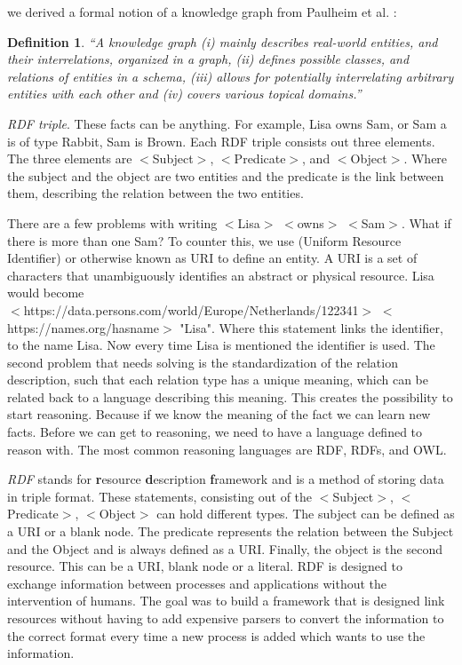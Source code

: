 \documentclass[11pt,letterpaper ,oneside ]{book}
\newtheorem{definition}{Definition}
\begin{document}
	we derived a formal notion of a knowledge graph from Paulheim et al. \cite{HeikoP:2016}:
	\begin{definition} 
		“A knowledge graph (i) mainly describes real-world entities, and their interrelations, organized in a graph, (ii) defines possible classes, and relations of entities in a schema, (iii) allows for potentially interrelating arbitrary entities with each other and (iv) covers various topical domains.”
	\end{definition}
	
	\textit{RDF triple}. These facts can be anything. For example, Lisa owns Sam, or Sam a is of type Rabbit, Sam is Brown. Each RDF triple consists out three elements.
	The three elements are $<$Subject$>$, $<$Predicate$>$, and $<$Object$>$. Where the subject and the object are two entities and the predicate is the link between them, describing the relation between the two entities. 
	
	There are a few problems with writing $<$Lisa$>$ $<$owns$>$ $<$Sam$>$. What if there is more than one Sam? To counter this, we use (Uniform Resource Identifier) or otherwise known as URI to define an entity. A URI is a set of characters that unambiguously identifies an abstract or physical resource. Lisa would become \\$<$https://data.persons.com/world/Europe/Netherlands/122341$>$ $<$https://names.org/hasname$>$ "Lisa". Where this statement links the identifier, to the name Lisa. Now every time Lisa is mentioned the identifier is used. 
	The second problem that needs solving is the standardization of the relation description, such that each relation type has a unique meaning, which can be related back to a language describing this meaning. This creates the possibility to start reasoning. Because if we know the meaning of the fact we can learn new facts. Before we can get to reasoning, we need to have a language defined to reason with. The most common reasoning languages are RDF, RDFs, and OWL.
	
	\textit{RDF} \cite{rdfPrimer:2014} stands for \textbf{r}esource \textbf{d}escription \textbf{f}ramework and is a method of storing data in triple format. These statements, consisting out of the $<$Subject$>$, $<$Predicate$>$, $<$Object$>$ can hold different types. The subject can be defined as a URI or a blank node. The predicate represents the relation between the Subject and the Object and is always defined as a URI. Finally, the object is the second resource. This can be a URI, blank node or a literal.
	RDF is designed to exchange information between processes and applications without the intervention of humans. The goal was to build a framework that is designed link resources without having to add expensive parsers to convert the information to the correct format every time a new process is added which wants to use the information.\\
\end{document}
